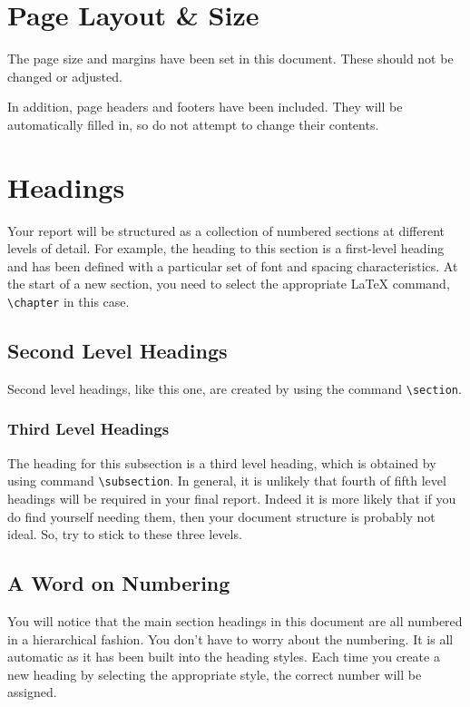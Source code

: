 \documentclass[]{final_report}
\begin{document}
\chapter{Page Layout \& Size}

The page size and margins have been set in this document. These should not be changed or adjusted. 

In addition, page headers and footers have been included. They will be automatically filled in, so do not attempt to change their contents.

\chapter{Headings}

Your report will be structured as a collection of numbered sections at different levels of detail. For example, the heading to this section is a first-level heading and has been defined with a particular set of font and spacing characteristics. At the start of a new section, you need to select the appropriate \LaTeX{} command, \verb|\chapter| in this case.
\section{Second Level Headings}
Second level headings, like this one, are created by using the command \verb|\section|.
\subsection{Third Level Headings}
The heading for this subsection is a third level heading, which is obtained by using command \verb|\subsection|. In general, it is unlikely that fourth of fifth level headings will be required in your final report. Indeed it is more likely that if you do find yourself needing them, then your document structure is probably not ideal. So, try to stick to these three levels.
\section{A Word on Numbering}
You will notice that the main section headings in this document are all numbered in a hierarchical fashion. You don't have to worry about the numbering. It is all automatic as it has been built into the heading styles. Each time you create a new heading by selecting the appropriate style, the correct number will be assigned. 
\end{document}
